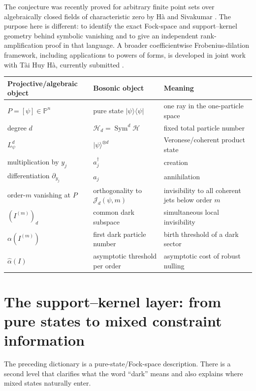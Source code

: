\documentclass[11pt]{article}
\theoremstyle{remark}
\newcommand{\PP}{\mathbb P}
\newcommand{\Sym}{\operatorname{Sym}}
\newcommand{\whalpha}{\widehat{\alpha}}
\newcommand{\cJ}{\mathcal J}
\newcommand{\HH}{\mathcal H}
\newcommand{\ket}[1]{\lvert #1\rangle}
\newcommand{\ketbra}[2]{\lvert #1\rangle\!\langle #2\rvert}
\begin{document}
The conjecture was recently proved for arbitrary finite point sets over algebraically closed fields of characteristic zero by H\`a and Sivakumar \cite{HaSivakumar2026}.  The purpose here is different: to identify the exact Fock-space and support--kernel geometry behind symbolic vanishing and to give an independent rank-amplification proof in that language.  A broader coefficientwise Frobenius-dilation framework, including applications to powers of forms, is developed in joint work with T\`ai Huy H\`a, currently submitted \cite{DinhHa2026}.

\begin{center}
\footnotesize
\begin{tabularx}{0.98\textwidth}{@{}>{\raggedright\arraybackslash}p{}>{\raggedright\arraybackslash}p{}>{\raggedright\arraybackslash}X@{}}
\toprule
\textbf{Projective/algebraic object} & \textbf{Bosonic object} & \textbf{Meaning}\\
\midrule
$P=[\psi]\in\PP^n$ & pure state $\ketbra{\psi}{\psi}$ & one ray in the one-particle space\\
degree $d$ & $\HH_d=\Sym^d\HH$ & fixed total particle number\\
$L_\psi^d$ & $\ket\psi^{\otimes d}$ & Veronese/coherent product state\\
multiplication by $y_j$ & $a_j^\dagger$ & creation\\
differentiation $\partial_{y_j}$ & $a_j$ & annihilation\\
order-$m$ vanishing at $P$ & orthogonality to $\cJ_d(\psi,m)$ & invisibility to all coherent jets below order $m$\\
$(I^{(m)})_d$ & common dark subspace & simultaneous local invisibility\\
$\alpha(I^{(m)})$ & first dark particle number & birth threshold of a dark sector\\
$\whalpha(I)$ & asymptotic threshold per order & asymptotic cost of robust nulling\\
\bottomrule
\end{tabularx}
\end{center}

\section{The support--kernel layer: from pure states to mixed constraint information}

The preceding dictionary is a pure-state/Fock-space description.  There is a second level that clarifies what the word ``dark'' means and also explains where mixed states naturally enter.
\end{document}
